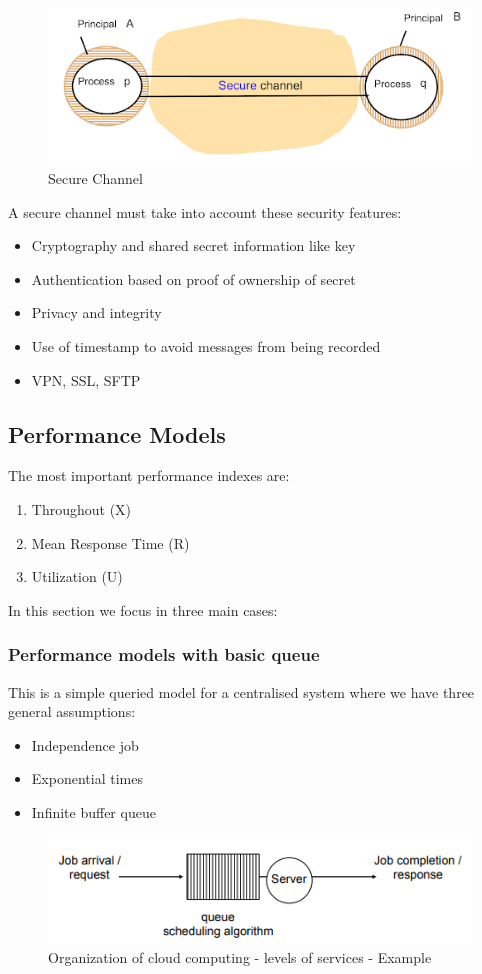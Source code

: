 \begin{figure}[!h]
            \centering
            \includegraphics[width=.7\linewidth]{images/modelOfSystems/SecureChannel.jpeg}
            \caption{Secure Channel
}
    \end{figure}
A secure channel must take into account these security features:
\begin{itemize}
    \item Cryptography and shared secret information like key
    \item Authentication based on proof of ownership of secret
    \item Privacy and integrity
    \item Use of timestamp to avoid messages from being recorded
    \item VPN, SSL, SFTP
\end{itemize}

\subsection{Performance Models}
The most important performance indexes are:
\begin{enumerate}
    \item Throughout (X)
    \item Mean Response Time (R)
    \item Utilization (U)
\end{enumerate}
In this section we focus in three main cases:
\subsubsection{Performance models with basic queue}
This is a simple queried model for a centralised system where we have three general assumptions:
\begin{itemize}
    \item Independence job
    \item Exponential times 
    \item Infinite buffer queue
\end{itemize}
\begin{figure}[!h]
            \centering
            \includegraphics[width=.7\linewidth]{images/modelOfSystems/PerformanceModelsWithBasicQueue.png}
            \caption{Organization of cloud computing - levels of services - Example
}
    \end{figure}

